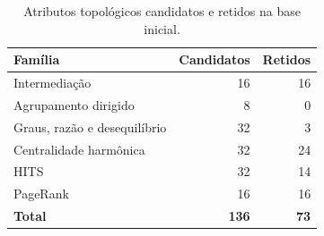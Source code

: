 \begin{table}[!htbp]
\centering
\caption{Atributos topológicos candidatos e retidos na base inicial.}
\label{tab:res-topologia}
\begin{singlespace}
\normalsize
\setlength{\tabcolsep}{5pt}
\renewcommand{\arraystretch}{1.15}
\begin{tabular}{lrr}
\hline\hline
\textbf{Família} & \textbf{Candidatos} & \textbf{Retidos} \\
\hline
Intermediação & 16 & 16 \\
Agrupamento dirigido & 8 & 0 \\
Graus, razão e desequilíbrio & 32 & 3 \\
Centralidade harmônica & 32 & 24 \\
HITS & 32 & 14 \\
PageRank & 16 & 16 \\
\textbf{Total} & \textbf{136} & \textbf{73} \\
\hline\hline
\end{tabular}
\par\smallskip
{}
\end{singlespace}
\end{table}
